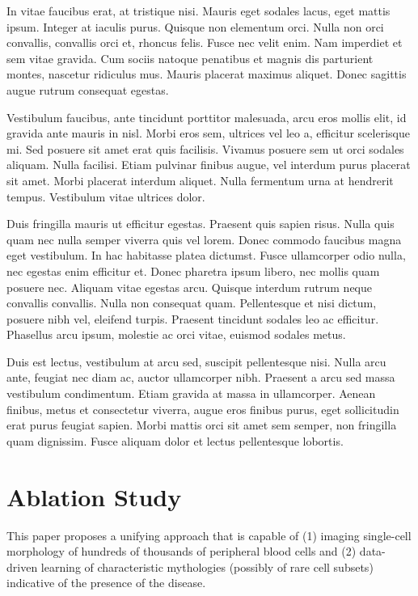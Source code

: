 In vitae faucibus erat, at tristique nisi. Mauris eget sodales lacus, eget mattis ipsum. Integer at iaculis purus. Quisque non elementum orci. Nulla non orci convallis, convallis orci et, rhoncus felis. Fusce nec velit enim. Nam imperdiet et sem vitae gravida. Cum sociis natoque penatibus et magnis dis parturient montes, nascetur ridiculus mus. Mauris placerat maximus aliquet. Donec sagittis augue rutrum consequat egestas.

Vestibulum faucibus, ante tincidunt porttitor malesuada, arcu eros mollis elit, id gravida ante mauris in nisl. Morbi eros sem, ultrices vel leo a, efficitur scelerisque mi. Sed posuere sit amet erat quis facilisis. Vivamus posuere sem ut orci sodales aliquam. Nulla facilisi. Etiam pulvinar finibus augue, vel interdum purus placerat sit amet. Morbi placerat interdum aliquet. Nulla fermentum urna at hendrerit tempus. Vestibulum vitae ultrices dolor.

Duis fringilla mauris ut efficitur egestas. Praesent quis sapien risus. Nulla quis quam nec nulla semper viverra quis vel lorem. Donec commodo faucibus magna eget vestibulum. In hac habitasse platea dictumst. Fusce ullamcorper odio nulla, nec egestas enim efficitur et. Donec pharetra ipsum libero, nec mollis quam posuere nec. Aliquam vitae egestas arcu. Quisque interdum rutrum neque convallis convallis. Nulla non consequat quam. Pellentesque et nisi dictum, posuere nibh vel, eleifend turpis. Praesent tincidunt sodales leo ac efficitur. Phasellus arcu ipsum, molestie ac orci vitae, euismod sodales metus.

Duis est lectus, vestibulum at arcu sed, suscipit pellentesque nisi. Nulla arcu ante, feugiat nec diam ac, auctor ullamcorper nibh. Praesent a arcu sed massa vestibulum condimentum. Etiam gravida at massa in ullamcorper. Aenean finibus, metus et consectetur viverra, augue eros finibus purus, eget sollicitudin erat purus feugiat sapien. Morbi mattis orci sit amet sem semper, non fringilla quam dignissim. Fusce aliquam dolor et lectus pellentesque lobortis. 






\chapter{Ablation Study}
\label{sec:examples}
This paper proposes a unifying approach that is capable of (1) imaging single-cell morphology of hundreds of thousands of peripheral blood cells and (2) data-driven learning of characteristic mythologies (possibly of rare cell subsets) indicative of the presence of the disease.

